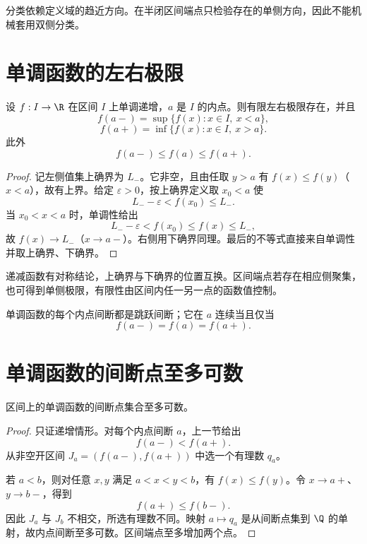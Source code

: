 分类依赖定义域的趋近方向。在半闭区间端点只检验存在的单侧方向，因此不能机械套用双侧分类。

\section{单调函数的左右极限}

\begin{theorem}[单调函数的单侧极限]
设 \(f:I\to\R\) 在区间 \(I\) 上单调递增，\(a\) 是 \(I\) 的内点。则有限左右极限存在，并且
\[
 f(a-)=\sup\{f(x):x\in I,\ x<a\},
\]
\[
 f(a+)=\inf\{f(x):x\in I,\ x>a\}.
\]
此外
\[
 f(a-)\le f(a)\le f(a+).
\]
\end{theorem}

\begin{proof}
记左侧值集上确界为 \(L_-\)。它非空，且由任取 \(y>a\) 有 \(f(x)\le f(y)\)（\(x<a\)），故有上界。给定 \(\varepsilon>0\)，按上确界定义取 \(x_0<a\) 使
\[
 L_--\varepsilon<f(x_0)\le L_-.
\]
当 \(x_0<x<a\) 时，单调性给出
\[
 L_--\varepsilon<f(x_0)\le f(x)\le L_-,
\]
故 \(f(x)\to L_-\)（\(x\to a-\)）。右侧用下确界同理。最后的不等式直接来自单调性并取上确界、下确界。
\end{proof}

递减函数有对称结论，上确界与下确界的位置互换。区间端点若存在相应侧聚集，也可得到单侧极限，有限性由区间内任一另一点的函数值控制。

\begin{corollary}
单调函数的每个内点间断都是跳跃间断；它在 \(a\) 连续当且仅当
\[
 f(a-)=f(a)=f(a+).
\]
\end{corollary}

\section{单调函数的间断点至多可数}

\begin{theorem}
区间上的单调函数的间断点集合至多可数。
\end{theorem}

\begin{proof}
只证递增情形。对每个内点间断 \(a\)，上一节给出
\[
 f(a-)<f(a+).
\]
从非空开区间 \(J_a=(f(a-),f(a+))\) 中选一个有理数 \(q_a\)。

若 \(a<b\)，则对任意 \(x,y\) 满足 \(a<x<y<b\)，有 \(f(x)\le f(y)\)。令 \(x\to a+\)、\(y\to b-\)，得到
\[
 f(a+)\le f(b-).
\]
因此 \(J_a\) 与 \(J_b\) 不相交，所选有理数不同。映射 \(a\mapsto q_a\) 是从间断点集到 \(\Q\) 的单射，故内点间断至多可数。区间端点至多增加两个点。
\end{proof}

